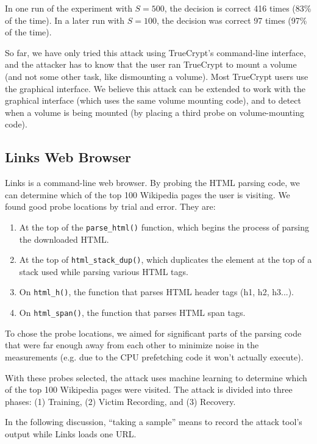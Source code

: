 \documentclass{acm_proc_article-sp}
\begin{document}
In one run of the experiment with $S=500$, the decision is correct 416 times
(83\% of the time). In a later run with $S=100$, the decision was correct 97
times (97\% of the time).

So far, we have only tried this attack using TrueCrypt's command-line interface,
and the attacker has to know that the user ran TrueCrypt to mount a volume (and
not some other task, like dismounting a volume). Most TrueCrypt users use the
graphical interface. We believe this attack can be extended to work with the
graphical interface (which uses the same volume mounting code), and to detect
when a volume is being mounted (by placing a third probe on volume-mounting
code).

\subsection{Links Web Browser}

Links is a command-line web browser. By probing the HTML parsing code, we can
determine which of the top 100 Wikipedia pages the user is visiting. We found
good probe locations by trial and error. They are:

\begin{enumerate}
    \item At the top of the \texttt{parse\_html()} function, which begins the
        process of parsing the downloaded HTML.
    \item At the top of \texttt{html\_stack\_dup()}, which duplicates the element
        at the top of a stack used while parsing various HTML tags.
    \item On \texttt{html\_h()}, the function that parses HTML header tags (h1,
        h2, h3...).
    \item On \texttt{html\_span()}, the function that parses HTML span tags.
\end{enumerate}

To chose the probe locations, we aimed for significant parts of the parsing code
that were far enough away from each other to minimize noise in the measurements
(e.g. due to the CPU prefetching code it won't actually execute).

With these probes selected, the attack uses machine learning to determine which
of the top 100 Wikipedia pages were visited. The attack is divided into three
phases: (1) Training, (2) Victim Recording, and (3) Recovery.

In the following discussion, ``taking a sample'' means to record the attack
tool's output while Links loads one URL.
\end{document}
